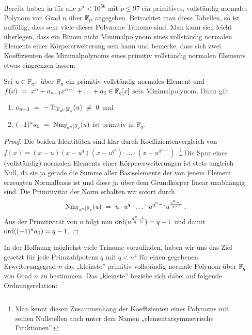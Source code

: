 Bereits \citeauthor{morgan1996} haben in \autocite{morgan1996} für alle 
$p^n < 10^{50}$ mit $p\leq 97$ ein primitives, vollständig normales Polynom 
von Grad $n$ über $\mathbb{F}_p$ angegeben. Betrachtet man diese Tabellen, so ist
auffällig, dass sehr viele dieser Polynome Trinome sind. Man kann sich leicht
überlegen, dass ein Binom nicht Minimalpolynom eines vollständig normalen
Elements einer Körpererweiterung sein kann und bemerke, dass sich 
zwei Koeffizienten des Minimalpolynoms eines primitiv vollständig normalen
Elements etwas eingrenzen lassen:

\begin{lemma}
  \label{lemma:pcn_koeff}
  Sei $u \in \mathbb{F}_{q^n}$ über $\mathbb{F}_q$ ein primitiv vollständig normales Element
  und $f(x) \ =\  x^n + a_{n-1}x^{n-1}+\ldots+a_0 \in \mathbb{F}_q[x]$ 
  sein Minimalpolynom. Dann gilt
  \begin{enumerate}
    \item $a_{n-1} \ =\  -\operatorname{Tr}_{\mathbb{F}_{q^n}\mid \mathbb{F}_q}(u) \ \neq\  0$ und 
    \item $(-1)^na_0 \ =\  \operatorname{Nm}_{\mathbb{F}_{q^n}\mid \mathbb{F}_q}(u)$ ist primitiv in $\mathbb{F}_q$.
  \end{enumerate}
\end{lemma}
\begin{proof}
  Die beiden Identitäten sind klar durch Koeffizientenvergleich von
  $f(x) = (x-u)(x-u^q)(x-u^{q^2})\cdot\ldots\cdot(x-u^{q^{n-1}})$.%
  \footnote{Man kennt diesen Zusammenhang der 
    Koeffizienten eines Polynoms mit seinen Nullstellen auch unter dem Namen
    „elementarsymmetrische Funktionen”.}
  Die Spur eines (vollständig) normalen Elements einer Körpererweiterungen ist
  stets ungleich Null, da sie ja gerade die Summe aller Basiselemente der 
  von jenem Element erzeugten Normalbasis ist und diese ja über dem Grundkörper
  linear unabhängig sind. 
  Die Primitivität der Norm erhalten wir sofort durch
  \[ \operatorname{Nm}_{\mathbb{F}_{q^n}\mid \mathbb{F}_q}(u) \ =\  u\cdot u^q\cdot \ldots\cdot u^{q^n-1}
    u^{\frac{q^n-1}{q-1}}\,.\]
  Aus der Primitivität von $u$ folgt nun $\operatorname{ord}(u^{\frac{q^n-1}{q-1}}) = q-1$
  und damit $\operatorname{ord}((-1)^na_0) = q-1$.
\end{proof}

In der Hoffnung möglichst viele Trinome vorzufinden, haben wir uns das Ziel
gesetzt für jede Primzahlpotenz $q$ mit $q < n^4$ für einen gegebenen
Erweiterungsgrad $n$ das „kleinste” primitiv vollständig normale Polynom
über $\mathbb{F}_q$ von Grad $n$ zu bestimmen. Das „kleinste” beziehe sich dabei auf
folgende Ordnungsrelation:

